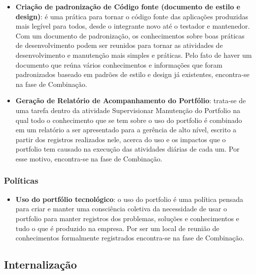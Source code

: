 \begin{itemize}
\item \textbf{Criação de padronização de Código fonte (documento de estilo e design)}: é uma prática para tornar o código fonte das aplicações produzidas mais legível para todos, desde o integrante novo até o testador e mantenedor. Com um documento de padronização, os conhecimentos sobre boas práticas de desenvolvimento podem ser reunidos para tornar as atividades de desenvolvimento e manutenção mais simples e práticas. Pelo fato de haver um documento que reúna vários conhecimentos e informações que foram padronizados baseado em padrões de estilo e design já existentes, encontra-se na fase de Combinação. 
\item \textbf{Geração de Relatório de Acompanhamento do Portfólio}: trata-se de uma tarefa dentro da atividade Supervisionar Manutenção do Portfolio na qual todo o conhecimento que se tem sobre o uso do portfolio é combinado em um relatório a ser apresentado para a gerência de alto nível, escrito a partir dos registros realizados nele, acerca do uso e os impactos que o portfolio tem causado na execução das atividades diárias de cada um. Por esse motivo, encontra-se na fase de Combinação.
\end{itemize}

\subsubsection{Políticas}
\begin{itemize}
\item \textbf{Uso do portfólio tecnológico}: o uso do portfolio é uma política pensada para criar e manter uma consciência coletiva da necessidade de usar o portfolio para manter registros dos problemas, soluções e conhecimentos e tudo o que é produzido na empresa. Por ser um local de reunião de conhecimentos formalmente registrados encontra-se na fase de Combinação.
\end{itemize}

\subsection{Internalização}

